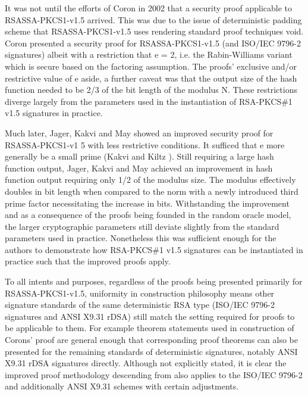\documentclass[]{final_report}
\theoremstyle{definition}
\begin{document}
It was not until the efforts of Coron \cite{coron2002security} in 2002 that a security proof applicable to RSASSA-PKCS1-v1.5 arrived. This was due to the issue of deterministic padding scheme that RSASSA-PKCS1-v1.5 uses rendering standard proof techniques void. Coron presented a security proof for RSASSA-PKCS1-v1.5 (and ISO/IEC 9796-2 signatures) albeit with a restriction that e = 2, i.e. the Rabin-Williams variant \cite{coron2002security} which is secure based on the factoring assumption. 
The proofs' exclusive and/or restrictive value of e aside, a further caveat was that the output size of the hash function needed to be 2/3 of the bit length of the modulus N. These restrictions diverge largely from the parameters used in the instantiation of RSA-PKCS\#1 v1.5 signatures in practice. 

Much later, Jager, Kakvi and May \cite{jager2018security} showed an improved security proof for RSASSA-PKCS1-v1 5 with less restrictive conditions.
It sufficed that e more generally be a small prime (Kakvi and Kiltz \cite{kakvi2018optimal}). Still requiring a large hash function output, Jager, Kakvi and May achieved an improvement in hash function output requiring only 1/2 of the modulus size. The modulus effectively doubles in bit length when compared to the norm with a newly introduced third prime factor necessitating the increase in bits.
Withstanding the improvement and as a consequence of the proofs being founded in the random oracle model, the larger cryptographic parameters still deviate slightly from the standard parameters used in practice. Nonetheless this was sufficient enough for the authors to demonstrate how RSA-PKCS\#1 v1.5 signatures can be instantiated in practice such that the improved proofs apply. 

To all intents and purposes, regardless of the proofs being presented primarily for RSASSA-PKCS1-v1.5, uniformity in construction philosophy means other signature standards of the same deterministic RSA type (ISO/IEC 9796-2 signatures and ANSI X9.31 rDSA) still match the setting required for proofs to be applicable to them. For example theorem statements used in construction of Corons' proof \cite{coron2002security} are general enough that corresponding proof theorems can also be presented for the remaining standards of deterministic signatures, notably ANSI X9.31 rDSA signatures directly. Although not explicitly stated, it is clear the improved proof methodology descending from \cite{coron2002security} also applies to the ISO/IEC 9796-2 and additionally ANSI X9.31 schemes with certain adjustments.
\end{document}

